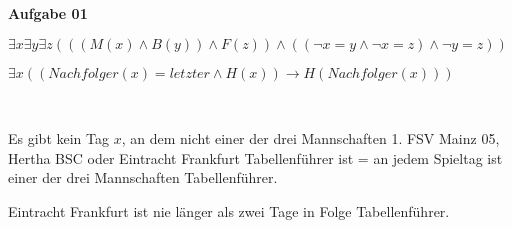 \documentclass[a4paper,10pt]{article}
\begin{document}
	\parindent0pt
	\textbf{Aufgabe 01}
	\begin{compactenum} [(a)]
		\item \begin{compactenum} [(i)]
			\item $ \exists x \exists y \exists z (((M(x) \wedge B(y)) \wedge F(z))\wedge ((\lnot x=y \wedge \lnot x=z) \wedge \lnot y=z)) $
			\item $ \exists x ((Nachfolger(x) = letzter \wedge H(x))\rightarrow H(Nachfolger(x))) $
		\end{compactenum} \
		\item \begin{compactenum} [(i)]
			\item Es gibt kein Tag $x$,  an dem nicht einer der drei Mannschaften 1. FSV Mainz 05, Hertha BSC oder Eintracht Frankfurt Tabellenführer ist = an jedem Spieltag ist einer der drei Mannschaften Tabellenführer.
			\item Eintracht Frankfurt ist nie länger als zwei Tage in Folge Tabellenführer.
		\end{compactenum}
	\end{compactenum} \
	
\end{document}
